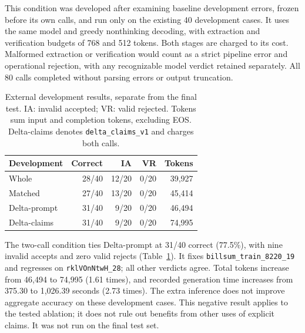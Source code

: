 \documentclass[10pt,letterpaper,twocolumn]{article}
\begin{document}
This condition was developed after examining baseline development errors, frozen before its own calls, and run only on the existing 40 development cases. It uses the same model and greedy nonthinking decoding, with extraction and verification budgets of 768 and 512 tokens. Both stages are charged to its cost. Malformed extraction or verification would count as a strict pipeline error and operational rejection, with any recognizable model verdict retained separately. All 80 calls completed without parsing errors or output truncation.

\begin{table}[t]
\centering\small
\begin{tabular}{@{}lrrrr@{}}
\toprule
Development & Correct & IA & VR & Tokens\\
\midrule
Whole & 28/40 & 12/20 & 0/20 & 39,927\\
Matched & 27/40 & 13/20 & 0/20 & 45,414\\
Delta-prompt & 31/40 & 9/20 & 0/20 & 46,494\\
Delta-claims & 31/40 & 9/20 & 0/20 & 74,995\\
\bottomrule
\end{tabular}
\caption{External development results, separate from the final test. IA: invalid accepted; VR: valid rejected. Tokens sum input and completion tokens, excluding EOS. Delta-claims denotes \texttt{delta\_claims\_v1} and charges both calls.}
\label{tab:naturaldev}
\end{table}

The two-call condition ties Delta-prompt at 31/40 correct (77.5\%), with nine invalid accepts and zero valid rejects (Table~\ref{tab:naturaldev}). It fixes \texttt{billsum\_train\_8220\_19} and regresses on \texttt{rklVOnNtwH\_28}; all other verdicts agree. Total tokens increase from 46,494 to 74,995 (1.61 times), and recorded generation time increases from 375.30 to 1,026.39 seconds (2.73 times). The extra inference does not improve aggregate accuracy on these development cases. This negative result applies to the tested ablation; it does not rule out benefits from other uses of explicit claims. It was not run on the final test set.
\end{document}
